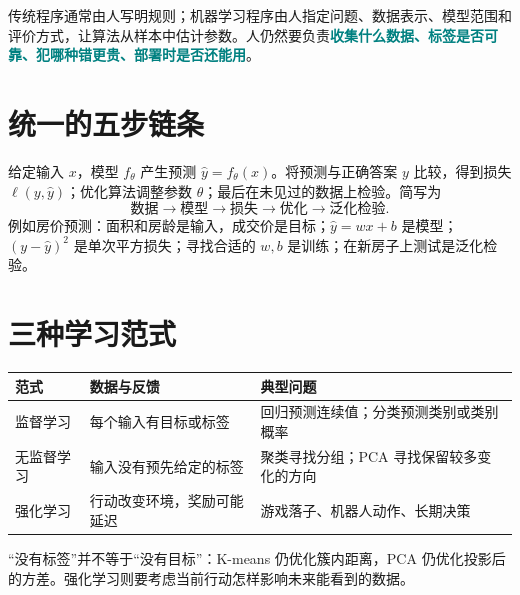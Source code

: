 \documentclass[UTF8,11pt,oneside]{ctexbook}
\newcommand{\key}[1]{\textcolor{teal}{\bfseries #1}}
\begin{document}
传统程序通常由人写明规则；机器学习程序由人指定问题、数据表示、模型范围和评价方式，让算法从样本中估计参数。人仍然要负责\key{收集什么数据、标签是否可靠、犯哪种错更贵、部署时是否还能用}。

\section{统一的五步链条}
给定输入 $x$，模型 $f_\theta$ 产生预测 $\hat y=f_\theta(x)$。将预测与正确答案 $y$ 比较，得到损失 $\ell(y,\hat y)$；优化算法调整参数 $\theta$；最后在未见过的数据上检验。简写为
\[
\boxed{\text{数据}\longrightarrow\text{模型}\longrightarrow\text{损失}\longrightarrow\text{优化}\longrightarrow\text{泛化检验}}.
\]
例如房价预测：面积和房龄是输入，成交价是目标；$\hat y=wx+b$ 是模型；$(y-\hat y)^2$ 是单次平方损失；寻找合适的 $w,b$ 是训练；在新房子上测试是泛化检验。

\section{三种学习范式}
\begin{center}\begin{tabular}{p{2.4cm}p{4.7cm}p{6.1cm}}\toprule
范式&数据与反馈&典型问题\\\midrule
监督学习&每个输入有目标或标签&回归预测连续值；分类预测类别或类别概率\\
无监督学习&输入没有预先给定的标签&聚类寻找分组；PCA 寻找保留较多变化的方向\\
强化学习&行动改变环境，奖励可能延迟&游戏落子、机器人动作、长期决策\\\bottomrule\end{tabular}\end{center}
“没有标签”并不等于“没有目标”：K-means 仍优化簇内距离，PCA 仍优化投影后的方差。强化学习则要考虑当前行动怎样影响未来能看到的数据。
\end{document}
